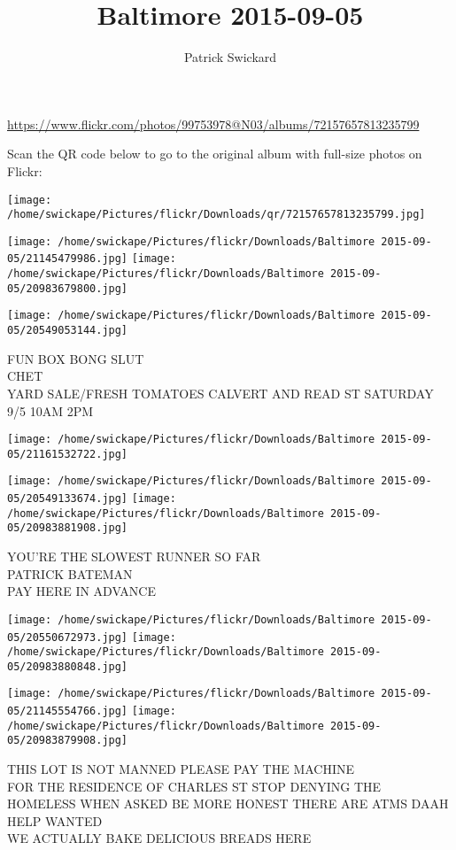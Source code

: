 \documentclass[10pt,letterpaper]{article}
\title{Baltimore 2015-09-05}
\author{Patrick Swickard}
\date{}
\begin{document}
\maketitle

\url{https://www.flickr.com/photos/99753978@N03/albums/72157657813235799}

Scan the QR code below to go to the original album with full-size photos on Flickr:

\texttt{[image: /home/swickape/Pictures/flickr/Downloads/qr/72157657813235799.jpg]}
\pagebreak

\texttt{[image: /home/swickape/Pictures/flickr/Downloads/Baltimore 2015-09-05/21145479986.jpg]}
\texttt{[image: /home/swickape/Pictures/flickr/Downloads/Baltimore 2015-09-05/20983679800.jpg]}

\texttt{[image: /home/swickape/Pictures/flickr/Downloads/Baltimore 2015-09-05/20549053144.jpg]}

FUN BOX BONG SLUT\\
CHET\\
YARD SALE/FRESH TOMATOES CALVERT AND READ ST SATURDAY 9/5 10AM 2PM
\pagebreak

\texttt{[image: /home/swickape/Pictures/flickr/Downloads/Baltimore 2015-09-05/21161532722.jpg]}

\vspace{0.25in}
\texttt{[image: /home/swickape/Pictures/flickr/Downloads/Baltimore 2015-09-05/20549133674.jpg]}
\texttt{[image: /home/swickape/Pictures/flickr/Downloads/Baltimore 2015-09-05/20983881908.jpg]}

YOU'RE THE SLOWEST RUNNER SO FAR\\
PATRICK BATEMAN\\
PAY HERE IN ADVANCE
\pagebreak

\texttt{[image: /home/swickape/Pictures/flickr/Downloads/Baltimore 2015-09-05/20550672973.jpg]}
\texttt{[image: /home/swickape/Pictures/flickr/Downloads/Baltimore 2015-09-05/20983880848.jpg]}

\texttt{[image: /home/swickape/Pictures/flickr/Downloads/Baltimore 2015-09-05/21145554766.jpg]}
\texttt{[image: /home/swickape/Pictures/flickr/Downloads/Baltimore 2015-09-05/20983879908.jpg]}

THIS LOT IS NOT MANNED PLEASE PAY THE MACHINE\\
FOR THE RESIDENCE OF CHARLES ST STOP DENYING THE HOMELESS WHEN ASKED BE MORE HONEST THERE ARE ATMS DAAH\\
HELP WANTED\\
WE ACTUALLY BAKE DELICIOUS BREADS HERE
\pagebreak
\end{document}
